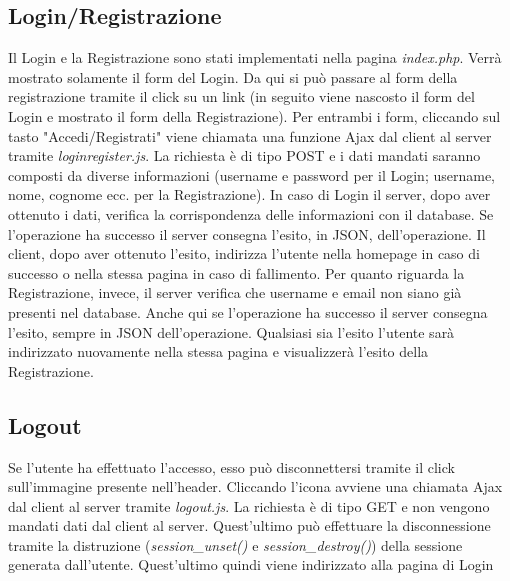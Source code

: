 \documentclass[12pt]{extarticle}
\begin{document}
\subsection{Login/Registrazione}
Il Login e la Registrazione sono stati implementati nella pagina \textit{index.php}. Verrà mostrato
solamente il form del Login. Da qui si può passare al form della registrazione tramite il click su un
link (in seguito viene nascosto il form del Login e mostrato il form della Registrazione).
Per entrambi i form, cliccando sul tasto "Accedi/Registrati" viene chiamata una funzione Ajax
dal client al server tramite \textit{loginregister.js}. La richiesta è di tipo POST e i dati mandati
saranno composti da diverse informazioni (username e password per il Login; username, nome,
cognome ecc. per la Registrazione). In caso di Login il server, dopo aver ottenuto i dati, verifica la
corrispondenza delle informazioni con il database. Se l'operazione ha successo il server
consegna l'esito, in JSON, dell'operazione. Il client, dopo aver ottenuto l'esito, indirizza l'utente
nella homepage in caso di successo o nella stessa pagina in caso di fallimento. Per quanto
riguarda la Registrazione, invece, il server verifica che username e email non siano già presenti nel
database. Anche qui se l'operazione ha successo il server consegna l'esito, sempre in JSON
dell'operazione. Qualsiasi sia l'esito l'utente sarà indirizzato nuovamente nella stessa pagina e
visualizzerà l'esito della Registrazione.

\subsection{Logout}
Se l'utente ha effettuato l'accesso, esso può disconnettersi tramite il click sull'immagine presente
nell'header. Cliccando l'icona avviene una chiamata Ajax dal client al server tramite \textit{logout.js}.
La richiesta è di tipo GET e non vengono mandati dati dal client al server. Quest'ultimo può
effettuare la disconnessione tramite la distruzione (\textit{session\_unset()} e \textit{session\_destroy()}) della
sessione generata dall'utente. Quest'ultimo quindi viene indirizzato alla pagina di Login
\end{document}
